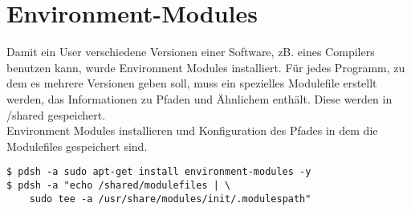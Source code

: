 \chapter{Environment-Modules}
Damit ein User verschiedene Versionen einer Software,
zB. eines Compilers benutzen kann, wurde Environment Modules installiert.
Für jedes Programm, zu dem es mehrere Versionen geben soll,
muss ein spezielles Modulefile erstellt werden,
das Informationen zu Pfaden und Ähnlichem enthält. Diese werden in /shared
gespeichert.\\
Environment Modules installieren und Konfiguration des Pfades in dem die Modulefiles
gespeichert sind.
\begin{lstlisting}[style=Bash]
$ pdsh -a sudo apt-get install environment-modules -y
$ pdsh -a "echo /shared/modulefiles | \
	sudo tee -a /usr/share/modules/init/.modulespath"
\end{lstlisting}
